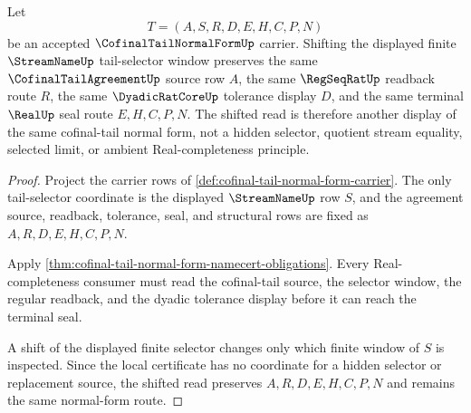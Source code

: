 \begin{theorem}
\label{thm:cofinal-tail-normal-form-shift-invariance}
Let
$$
T=(A,S,R,D,E,H,C,P,N)
$$
be an accepted $\CofinalTailNormalFormUp$ carrier. Shifting the displayed finite $\StreamNameUp$ tail-selector window preserves the same $\CofinalTailAgreementUp$ source row $A$, the same $\RegSeqRatUp$ readback route $R$, the same $\DyadicRatCoreUp$ tolerance display $D$, and the same terminal $\RealUp$ seal route $E,H,C,P,N$. The shifted read is therefore another display of the same cofinal-tail normal form, not a hidden selector, quotient stream equality, selected limit, or ambient Real-completeness principle.
\end{theorem}
\begin{proof}
Project the carrier rows of \autoref{def:cofinal-tail-normal-form-carrier}. The only tail-selector coordinate is the displayed $\StreamNameUp$ row $S$, and the agreement source, readback, tolerance, seal, and structural rows are fixed as $A,R,D,E,H,C,P,N$.

Apply \autoref{thm:cofinal-tail-normal-form-namecert-obligations}. Every Real-completeness consumer must read the cofinal-tail source, the selector window, the regular readback, and the dyadic tolerance display before it can reach the terminal seal.

A shift of the displayed finite selector changes only which finite window of $S$ is inspected. Since the local certificate has no coordinate for a hidden selector or replacement source, the shifted read preserves $A,R,D,E,H,C,P,N$ and remains the same normal-form route.
\end{proof}

